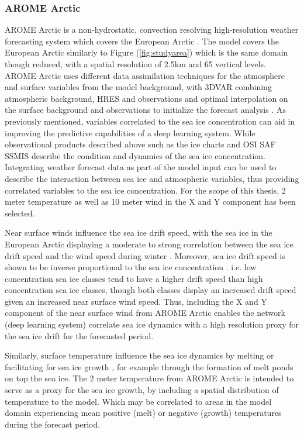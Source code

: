 \documentclass[../main/thesis.tex]{subfiles}
\begin{document}
\subsubsection{AROME Arctic}
AROME Arctic is a non-hydrostatic, convection resolving high-resolution weather forecasting system which covers the European Arctic \citep{Mueller2017}. The model covers the European Arctic similarly to Figure (\ref{fig:studyarea}) which is the same domain though reduced, with a spatial resolution of 2.5km and 65 vertical levels. AROME Arctic uses different data assimilation techniques for the atmosphere and surface variables from the model background, with 3DVAR combining atmospheric background, HRES and observations and optimal interpolation on the surface background and observations to initialize the forecast analysis \cite{Mueller2017}. As previously mentioned, variables correlated to the sea ice concentration can aid in improving the predictive capabilities of a deep learning system. While observational products described above such as the ice charts \citep{Dinessen2020} and OSI SAF SSMIS \citep{Tonboe2017} describe the condition and dynamics of the sea ice concentration. Integrating weather forecast data as part of the model input can be used to describe the interaction between sea ice and atmospheric variables, thus providing correlated variables to the sea ice concentration. For the scope of this thesis, 2 meter temperature as well as 10 meter wind in the X and Y component has been selected.

Near surface winds influence the sea ice drift speed, with the sea ice in the European Arctic displaying a moderate to strong correlation between the sea ice drift speed and the wind speed during winter \citep{Spreen2011}. Moreover, sea ice drift speed is shown to be inverse proportional to the sea ice concentration \citep{Yu2020}. i.e. low concentration sea ice classes tend to have a higher drift speed  than high concentration sea ice classes, though both classes display an increased drift speed given an increased near surface wind speed. Thus, including the X and Y component of the near surface wind from AROME Arctic enables the network (deep learning system) correlate sea ice dynamics with a high resolution proxy for the sea ice drift for the forecasted period.

Similarly, surface temperature influence the sea ice dynamics by melting or facilitating for sea ice growth \citep{Hibler1979}, for example through the formation of melt ponds on top the sea ice. The 2 meter temperature from AROME Arctic is intended to serve as a proxy for the sea ice growth, by including a spatial distribution of temperature to the model. Which may be correlated to areas in the model domain experiencing mean positive (melt) or negative (growth) temperatures during the forecast period.
\end{document}
